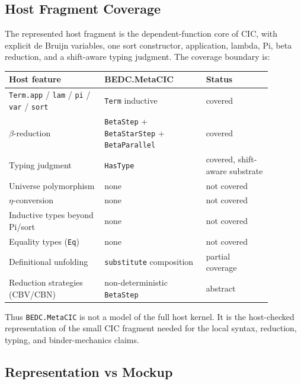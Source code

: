 \subsection{Host Fragment Coverage}\label{subsec:reconstruction-host-fragment-coverage}

The represented host fragment is the dependent-function core of CIC, with
explicit de Bruijn variables, one sort constructor, application, lambda, Pi,
beta reduction, and a shift-aware typing judgment. The coverage boundary is:

\begin{center}
\begin{tabular}{p{0.32\linewidth}p{0.34\linewidth}p{0.22\linewidth}}
\hline
Host feature & BEDC.MetaCIC & Status \\
\hline
\texttt{Term.app} / \texttt{lam} / \texttt{pi} / \texttt{var} / \texttt{sort} & \texttt{Term} inductive & covered \\
$\beta$-reduction & \texttt{BetaStep} + \texttt{BetaStarStep} + \texttt{BetaParallel} & covered \\
Typing judgment & \texttt{HasType} & covered, shift-aware substrate \\
Universe polymorphism & none & not covered \\
$\eta$-conversion & none & not covered \\
Inductive types beyond Pi/sort & none & not covered \\
Equality types (\texttt{Eq}) & none & not covered \\
Definitional unfolding & \texttt{substitute} composition & partial coverage \\
Reduction strategies (CBV/CBN) & non-deterministic \texttt{BetaStep} & abstract \\
\hline
\end{tabular}
\end{center}

Thus \texttt{BEDC.MetaCIC} is not a model of the full host kernel. It is the
host-checked representation of the small CIC fragment needed for the local
syntax, reduction, typing, and binder-mechanics claims.



\subsection{Representation vs Mockup}\label{subsec:reconstruction-rep-vs-mockup}

